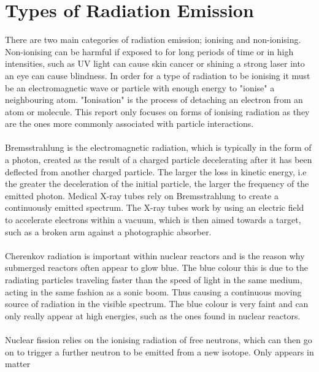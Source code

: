 \documentclass[12pt,a4paper]{article}
\begin{document}

\section{Types of Radiation Emission }
\label{radd}
There are two main categories of radiation emission; ionising and non-ionising. Non-ionising can be harmful if exposed to for long periods of time or in high intensities, such as UV light can cause skin cancer or shining a strong laser into an eye can cause blindness. In order for a type of radiation to be ionising it must be an electromagnetic wave or particle with enough energy to "ionise" a neighbouring atom.  "Ionisation" is the process of detaching an electron from an atom or molecule. This report only focuses on forms of ionising radiation as they are the ones more commonly associated with particle interactions. 
\\\\ 
\noindent Bremsstrahlung is the electromagnetic radiation, which is typically in the form of a photon, created as the result of a charged particle decelerating after it has been deflected from another charged particle. The larger the loss in kinetic energy, i.e the greater the deceleration of the initial particle, the larger the frequency of the emitted photon. Medical X-ray tubes rely on Bremsstrahlung to create a continuously emitted spectrum. The X-ray tubes work by using an electric field to accelerate electrons within a vacuum, which is then aimed towards a target, such as a broken arm against a photographic absorber.
\\\\
\noindent Cherenkov radiation is important within nuclear reactors and is the reason why submerged reactors often appear to glow blue. The blue colour this is due to the radiating particles traveling faster than the speed of light in the same medium, acting in the same fashion as a sonic boom. Thus causing a continuous moving source of radiation in the visible spectrum. The blue colour is very faint and can only really appear at high energies, such as the ones found in nuclear reactors. 
\\\\
\noindent Nuclear fission relies on the ionising radiation of free neutrons, which can then go on to trigger a further neutron to be emitted from a new isotope. Only appears in matter
\end{document}
